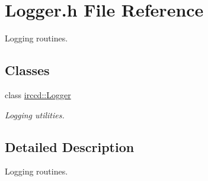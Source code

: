 \hypertarget{a00087}{\section{Logger.\-h File Reference}
\label{a00087}
}


Logging routines.  


\subsection*{Classes}
\begin{DoxyCompactItemize}
\item 
class \hyperlink{a00039}{irccd\-::\-Logger}
\begin{DoxyCompactList}\small\item\em Logging utilities. \end{DoxyCompactList}\end{DoxyCompactItemize}


\subsection{Detailed Description}
Logging routines. 